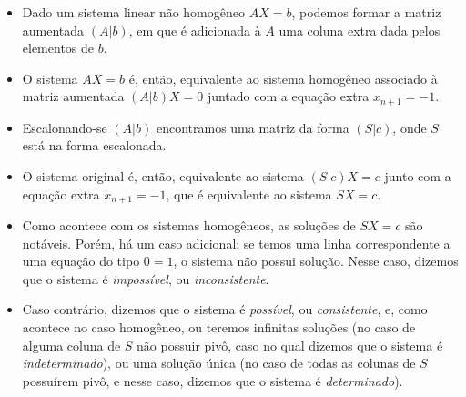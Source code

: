\begin{itemize}
    \item Dado um sistema linear não homogêneo $AX=b$, podemos formar a matriz aumentada $(A|b)$, em que é adicionada à $A$ uma coluna extra dada pelos elementos de $b$.
    \item O sistema $AX=b$ é, então, equivalente ao sistema homogêneo associado à matriz aumentada $(A|b)X=0$ juntado com a equação extra $x_{n+1}=-1$.
    \item Escalonando-se $(A|b)$ encontramos uma matriz da forma $(S|c)$, onde $S$ está na forma escalonada.
    \item O sistema original é, então, equivalente ao sistema $(S|c)X=c$ junto com a equação extra $x_{n+1}=-1$, que é equivalente ao sistema $SX=c$.
    \item Como acontece com os sistemas homogêneos, as soluções de $SX=c$ são notáveis. Porém, há um caso adicional: se temos uma linha correspondente a uma equação do tipo $0=1$, o sistema não possui solução. Nesse caso, dizemos que o sistema é \emph{impossível}, ou \emph{inconsistente}.
    \item Caso contrário, dizemos que o sistema é \emph{possível}, ou \emph{consistente}, e, como acontece no caso homogêneo, ou teremos infinitas soluções (no caso de alguma coluna de $S$ não possuir pivô, caso no qual dizemos que o sistema é \emph{indeterminado}), ou uma solução única (no caso de todas as colunas de $S$ possuírem pivô, e nesse caso, dizemos que o sistema é \emph{determinado}).
\end{itemize}